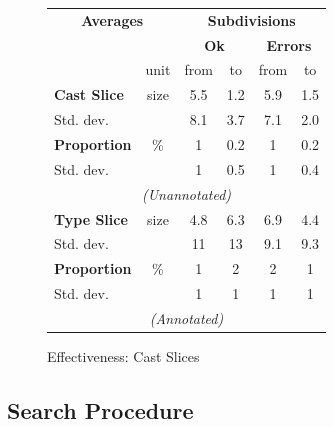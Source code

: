 \begin{figure}[h]
  \centering
  \begin{tabular}{lc|cc|cc}
  \multicolumn{2}{c}{\textbf{Averages}} & \multicolumn{4}{c}{\textbf{Subdivisions}}\\
  & & \multicolumn{2}{c|}{\textbf{Ok}} & \multicolumn{2}{c}{\textbf{Errors}}\\ 
   & unit & from & to & from & to\\
   \hline
   \textbf{Cast Slice} & size &  5.5 & 1.2 & 5.9 & 1.5 \\
   Std. dev. &  				 &  8.1 & 3.7 & 7.1 & 2.0\\
   \textbf{Proportion}& \%    & 1 & 0.2 & 1 & 0.2\\
   Std. dev. &  				 &  1 & 0.5 & 1 & 0.4\\
   \multicolumn{6}{c}{\textit{(Unannotated)}}\\
   \textbf{Type Slice} & size &  4.8 & 6.3 & 6.9 & 4.4  \\
   Std. dev. 			&    &  11 & 13 & 9.1 & 9.3\\
   \textbf{Proportion}& \% 	 & 1 & 2 & 2 & 1\\
   Std. dev. &  				 &  1 & 1 & 1 & 1\\
   \multicolumn{6}{c}{\textit{(Annotated)}}
  \end{tabular}
  \caption{Effectiveness: Cast Slices}
\label{fig:CastSlicingEffectiveness}
\end{figure}


\subsection{Search Procedure}

